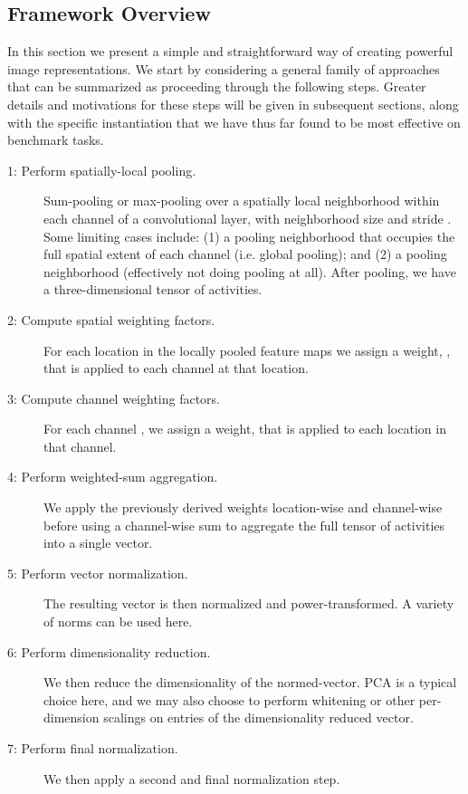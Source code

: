 \documentclass[runningheads]{llncs}
\begin{document}
\subsection{Framework Overview}

In this section we present a simple and straightforward way of creating powerful image representations.
We start by considering a general family of approaches that can be summarized as proceeding through the following steps. Greater details and motivations for these steps will be given in subsequent sections, along with the specific instantiation that we have thus far found to be most effective on benchmark tasks. 






\begin{description}
  \item[1: Perform spatially-local pooling.]
	Sum-pooling or max-pooling over a spatially local neighborhood within each channel of a convolutional layer, with neighborhood size  and stride . Some limiting cases include: (1) a pooling neighborhood that occupies the full spatial extent of each channel (i.e. global pooling); and (2) a  pooling neighborhood (effectively not doing pooling at all). After pooling, we have a three-dimensional tensor of activities.
\item[2: Compute spatial weighting factors.]
  For each location  in the locally pooled feature maps we assign a weight, , that is applied to each channel at that location.
\item[3: Compute channel weighting factors.]
  For each channel , we assign a weight,  that is applied to each location in that channel.
\item[4: Perform weighted-sum aggregation.]
  We apply the previously derived weights location-wise and channel-wise before using a channel-wise sum to aggregate the full tensor of activities into a single vector.
\item[5: Perform vector normalization.]
 The resulting vector is then normalized and power-transformed. A variety of norms can be used here.
\item[6: Perform dimensionality reduction.]
 We then reduce the dimensionality of the normed-vector. PCA is a typical choice here, and we may also choose to perform whitening or other per-dimension scalings on entries of the dimensionality reduced vector.
\item[7: Perform final normalization.]
 We then apply a second and final normalization step.
\end{description}
\end{document}
